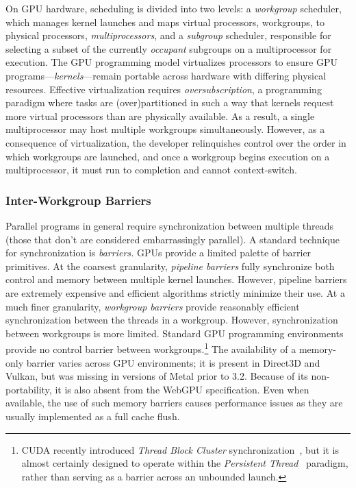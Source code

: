 \documentclass[acmsmall, manuscript, screen, review, anonymous]{acmart}
\begin{document}
On GPU hardware, scheduling is divided into two levels: a \emph{workgroup} scheduler, which manages kernel launches and maps virtual processors, workgroups, to physical processors, \emph{multiprocessors}, and a \emph{subgroup} scheduler, responsible for selecting a subset of the currently \emph{occupant} subgroups on a multiprocessor for execution. The GPU programming model virtualizes processors to ensure GPU programs---\emph{kernels}---remain portable across hardware with differing physical resources. Effective virtualization requires \emph{oversubscription}, a programming paradigm where tasks are (over)partitioned in such a way that kernels request more virtual processors than are physically available. As a result, a single multiprocessor may host multiple workgroups simultaneously. However, as a consequence of virtualization, the developer relinquishes control over the order in which workgroups are launched, and once a workgroup begins execution on a multiprocessor, it must run to completion and cannot context-switch.

\subsubsection{Inter-Workgroup Barriers}
Parallel programs in general require synchronization between multiple threads (those that don't are considered embarrassingly parallel). A standard technique for synchronization is \emph{barriers.} GPUs provide a limited palette of barrier primitives. At the coarsest granularity, \emph{pipeline barriers} fully synchronize both control and memory between multiple kernel launches. However, pipeline barriers are extremely expensive and efficient algorithms strictly minimize their use. At a much finer granularity, \emph{workgroup barriers} provide reasonably efficient synchronization between the threads in a workgroup. However, synchronization between workgroups is more limited. Standard GPU programming environments provide no control barrier between workgroups.\footnote{CUDA recently introduced \emph{Thread Block Cluster} synchronization~\cite{NvidiaCudaGuide}, but it is almost certainly designed to operate within the \emph{Persistent Thread}~\cite{gupta2012} paradigm, rather than serving as a barrier across an unbounded launch.} The availability of a memory-only barrier varies across GPU environments; it is present in Direct3D and Vulkan, but was missing in versions of Metal prior to 3.2. Because of its non-portability, it is also absent from the WebGPU specification. Even when available, the use of such memory barriers causes performance issues as they are usually implemented as a full cache flush.
\end{document}
